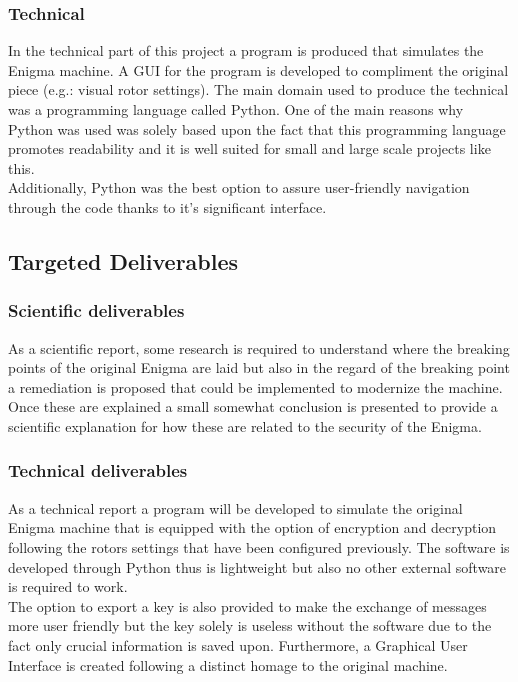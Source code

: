 \documentclass[conference,compsoc]{IEEEtran}
\begin{document}
\subsubsection{Technical}
In the technical part of this project a program is produced that simulates the Enigma machine. A GUI for the program is developed to compliment the original piece (e.g.: visual rotor settings). The main domain used to produce the technical was a programming language called Python. One of the main reasons why Python was used was solely based upon the fact that this programming language promotes readability and it is well suited for small and large scale projects like this.\\
Additionally, Python was the best option to assure user-friendly navigation through the code thanks to it's significant interface.\\

\subsection{Targeted Deliverables}
\label{sec-deliverables}
\subsubsection{Scientific deliverables}
As a scientific report, some research is required to understand where the breaking points of the original Enigma are laid but also in the regard of the breaking point a remediation is proposed that could be implemented to modernize the machine. Once these are explained a small somewhat conclusion is presented to provide a scientific explanation for how these are related to the security of the Enigma.

\subsubsection{Technical deliverables}
As a technical report a program will be developed to simulate the original Enigma machine that is equipped with the option of encryption and decryption following the rotors settings that have been configured previously. The software is developed through Python thus is lightweight but also no other external software is required to work. \\
The option to export a key is also provided to make the exchange of messages more user friendly but the key solely is useless without the software due to the fact only crucial information is saved upon. Furthermore, a Graphical User Interface is created following a distinct homage to the original machine.\\
\end{document}
